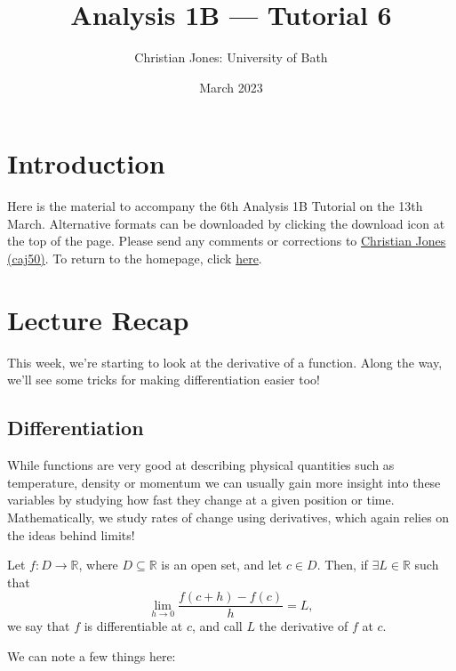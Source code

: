 \documentclass[
  10pt,
  a4paper]{article}
\title{Analysis 1B --- Tutorial 6}
\author{Christian Jones: University of Bath}
\date{March 2023}
\theoremstyle{plain}
\theoremstyle{definition}
\theoremstyle{plain}
\theoremstyle{plain}
\theoremstyle{plain}
\theoremstyle{plain}
\theoremstyle{definition}
\theoremstyle{definition}
\theoremstyle{remark}
\theoremstyle{remark}
\let\BeginKnitrBlock\begin \let\EndKnitrBlock\end
\begin{document}
\maketitle

{
\setcounter{tocdepth}{2}
\tableofcontents
}
\newpage
{}

\hypertarget{introduction}{%
\section*{Introduction}\label{introduction}}

Here is the material to accompany the 6th Analysis 1B Tutorial on the 13th March. Alternative formats can be downloaded by clicking the download icon at the top of the page. Please send any comments or corrections to \href{mailto:caj50@bath.ac.uk}{Christian Jones (caj50)}. To return to the homepage, click \href{http://caj50.github.io/tutoring.html}{here}.

\hypertarget{lecture-recap}{%
\section{Lecture Recap}\label{lecture-recap}}

This week, we're starting to look at the derivative of a function. Along the way, we'll see some tricks for making differentiation easier too!

\hypertarget{differentiation}{%
\subsection{Differentiation}\label{differentiation}}

While functions are very good at describing physical quantities such as temperature, density or momentum we can usually gain more insight into these variables by studying how fast they change at a given position or time. Mathematically, we study rates of change using derivatives, which again relies on the ideas behind limits!

\BeginKnitrBlock{definition}[Derivative]
{\label{def:def1} }Let \(f: D \to \mathbb{R}\), where \(D \subseteq \mathbb{R}\) is an open set, and let \(c \in D\). Then, if \(\exists L \in \mathbb{R}\) such that \[\lim_{h \to 0}\frac{f(c+h) - f(c)}{h} = L,\] we say that \(f\) is differentiable at \(c\), and call \(L\) the derivative of \(f\) at \(c\).
\EndKnitrBlock{definition}
We can note a few things here:
\end{document}
